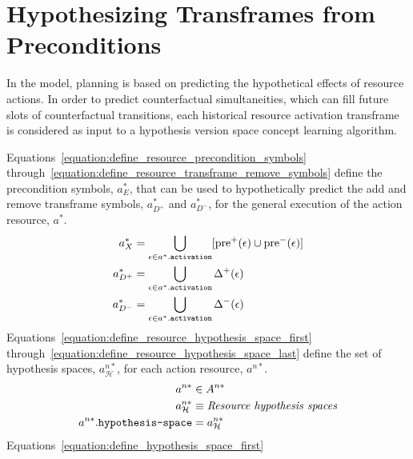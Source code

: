 
\section{Hypothesizing Transframes from Preconditions}

In the model, planning is based on predicting the hypothetical effects
of resource actions.  In order to predict counterfactual
simultaneities, which can fill future slots of counterfactual
transitions, each historical resource activation transframe is
considered as input to a hypothesis version space concept learning
algorithm.

Equations\ \ref{equation:define_resource_precondition_symbols}
through\ \ref{equation:define_resource_transframe_remove_symbols}
define the precondition symbols, $a^*_E$, that can be used to
hypothetically predict the add and remove transframe symbols,
$a^*_{D^+}$ and $a^*_{D^-}$, for the general execution of the action
resource, $a^*$.
\begin{align}
\label{equation:define_resource_precondition_symbols}
  a^*_X &= \bigcup_{\epsilon \in a^*.\text{\tt{activation}}} [\text{pre}^{+}(\epsilon) \cup \text{pre}^{-}(\epsilon)] \\
\label{equation:define_resource_transframe_add_symbols}
  a^*_{D^+} &= \bigcup_{\epsilon \in a^*.\text{\tt{activation}}} \Delta^{+}(\epsilon) \\
\label{equation:define_resource_transframe_remove_symbols}
  a^*_{D^-} &= \bigcup_{\epsilon \in a^*.\text{\tt{activation}}} \Delta^{-}(\epsilon)
\end{align}
Equations\ \ref{equation:define_resource_hypothesis_space_first}
through\ \ref{equation:define_resource_hypothesis_space_last} define
the set of hypothesis spaces, $a_{\mathcal{H}}^{n*}$, for each action
resource, $a^{n*}$.
\begin{align}
\label{equation:define_resource_hypothesis_space_first}
                             a^{n*} &\in A^{n*} \\
                 a_{\mathcal{H}}^{n*} &\equiv \text{\emph{Resource hypothesis spaces}} \\
\label{equation:define_resource_hypothesis_space_last}
a^{n*}.\text{\tt{hypothesis-space}} &= a_{\mathcal{H}}^{n*} \\
\end{align}
Equations\ \ref{equation:define_hypothesis_space_first}
